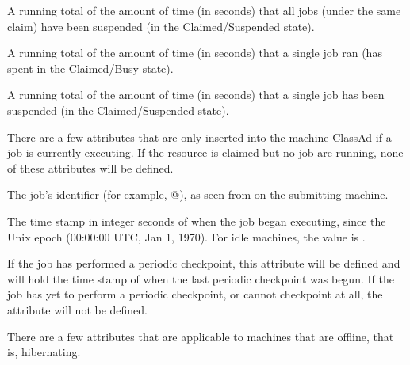 \begin{description}
\item[\AdAttr{TotalClaimSuspendTime}:] A running total of the amount of
time (in seconds) that all jobs (under the same claim) have been
suspended (in the Claimed/Suspended state).

\item[\AdAttr{TotalJobRunTime}:] A running total of the amount of
time (in seconds) that a single job ran
(has spent in the Claimed/Busy state).

\item[\AdAttr{TotalJobSuspendTime}:] A running total of the amount of
time (in seconds) that a single job has been suspended
(in the Claimed/Suspended state).

\end{description}

There are a few attributes that are only inserted into the
machine ClassAd if a job is currently executing.  
If the resource is claimed but no job are running, none of these
attributes will be defined.

\begin{description}

\item[\AdAttr{JobId}:] The job's identifier (for example,
@), as seen from 
on the submitting machine.

\item[\AdAttr{JobStart}:] The time stamp in integer seconds of when the job began
executing, since the Unix epoch (00:00:00 UTC, Jan 1, 1970).  For idle
machines, the value is .

\item[\AdAttr{LastPeriodicCheckpoint}:] If the job has performed a
periodic checkpoint, this attribute will be defined and will hold the
time stamp of when the last periodic checkpoint was begun.
If the job has yet to perform a periodic checkpoint, or cannot
checkpoint at all, the  attribute will
not be defined.

\end{description}

There are a few attributes that are applicable to machines that
are offline, that is, hibernating.


